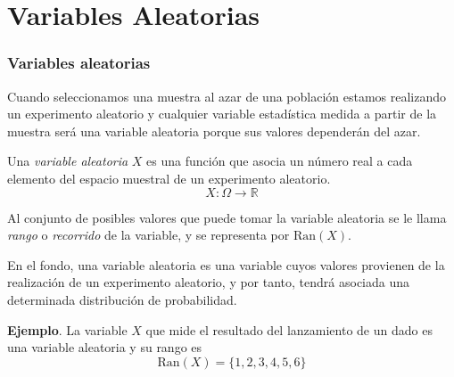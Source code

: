 \section{Variables Aleatorias}



\begin{frame}
\frametitle{Variables aleatorias}
Cuando seleccionamos una muestra al azar de una población estamos realizando un experimento aleatorio y cualquier variable estadística medida a partir de la muestra será una variable aleatoria porque sus valores dependerán del azar. 

\begin{definicion} 
Una \emph{variable aleatoria} $X$ es una función que asocia un número real a cada elemento del espacio muestral de un experimento aleatorio. 
\[ 
	X:\Omega \rightarrow \mathbb{R} 
\]

Al conjunto de posibles valores que puede tomar la variable aleatoria se le llama \emph{rango} o \emph{recorrido} de la variable, y se representa por $\mbox{Ran}(X)$.
\end{definicion}

En el fondo, una variable aleatoria es una variable cuyos valores provienen de la realización de un experimento aleatorio, y por tanto, tendrá asociada una determinada distribución de probabilidad.

\textbf{Ejemplo}. La variable $X$ que mide el resultado del lanzamiento de un dado es una variable aleatoria y su rango es 
\[
	\mbox{Ran}(X)=\{1,2,3,4,5,6\}
\]

\end{frame}
